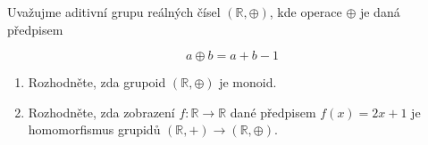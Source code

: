 Uvažujme aditivní grupu reálných čísel $(\mathbb{R}, \oplus)$, kde operace
$\oplus$ je daná předpisem

$$a\oplus b=a+b-1$$

\begin{enumerate}
  \item Rozhodněte, zda grupoid $(\mathbb{R}, \oplus)$ je monoid.
  \item Rozhodněte, zda zobrazení $f:\mathbb{R} \rightarrow \mathbb{R}$ dané
  předpisem $f(x) = 2x + 1$ je homomorfismus grupidů $(\mathbb{R}, +)
  \rightarrow (\mathbb{R}, \oplus)$.
\end{enumerate}
